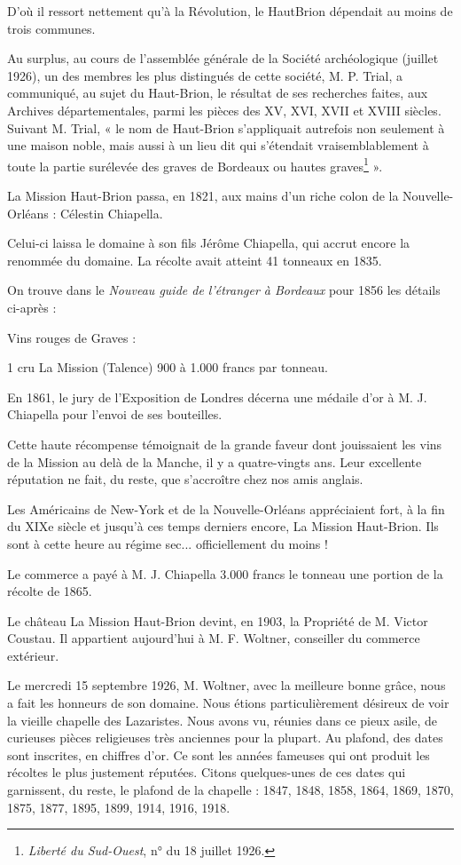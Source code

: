 D'où il ressort nettement qu'à la Révolution, le HautBrion dépendait au moins de trois communes.

Au surplus, au cours de l'assemblée générale de la Société archéologique (juillet 1926), un des membres les plus distingués de cette société, M. P. Trial, a communiqué, au sujet du Haut-Brion, le résultat de ses recherches faites, aux Archives départementales, parmi les pièces des XV\ieme{}, XVI\ieme{}, XVII\ieme{} et XVIII\ieme{} siècles. Suivant M. Trial, « le nom de Haut-Brion s'appliquait autrefois non seulement à une maison noble, mais aussi à un lieu dit qui s'étendait vraisemblablement à toute la partie surélevée des graves de Bordeaux ou hautes graves\footnote{\textit{Liberté du Sud-Ouest}, n° du 18 juillet 1926.} ».

\asterism{}

La Mission Haut-Brion passa, en 1821, aux mains d'un riche colon de la Nouvelle-Orléans : Célestin Chiapella.

Celui-ci laissa le domaine à son fils Jérôme Chiapella, qui accrut encore la renommée du domaine. La récolte avait atteint 41 tonneaux en 1835.

On trouve dans le \textit{Nouveau guide de l'étranger à Bordeaux} pour 1856 les détails ci-après : 

Vins rouges de Graves : 

1\ier{} cru La Mission (Talence) 900 à 1.000 francs par tonneau.

En 1861, le jury de l'Exposition de Londres décerna une médaile d'or à M. J. Chiapella pour l'envoi de ses bouteilles.

Cette haute récompense témoignait de la grande faveur dont jouissaient les vins de la Mission au delà de la Manche, il y a quatre-vingts ans. Leur excellente réputation ne fait, du reste, que s'accroître chez nos amis anglais.

Les Américains de New-York et de la Nouvelle-Orléans appréciaient fort, à la fin du XIXe siècle et jusqu'à ces temps derniers encore, La Mission Haut-Brion. Ils sont à cette heure au régime sec... officiellement du moins !

Le commerce a payé à M. J. Chiapella 3.000 francs le tonneau une portion de la récolte de 1865.

Le château La Mission Haut-Brion devint, en 1903, la Propriété de M. Victor Coustau. Il appartient aujourd'hui à M. F. Woltner, conseiller du commerce extérieur.

Le mercredi 15 septembre 1926, M. Woltner, avec la meilleure bonne grâce, nous a fait les honneurs de son domaine. Nous étions particulièrement désireux de voir la vieille chapelle des Lazaristes. Nous avons vu, réunies dans ce pieux asile, de curieuses pièces religieuses très anciennes pour la plupart. Au plafond, des dates sont inscrites, en chiffres d'or. Ce sont les années fameuses qui ont produit les récoltes le plus justement réputées. Citons quelques-unes de ces dates qui garnissent, du reste, le plafond de la chapelle : 1847, 1848, 1858, 1864, 1869, 1870, 1875, 1877, 1895, 1899, 1914, 1916, 1918.

